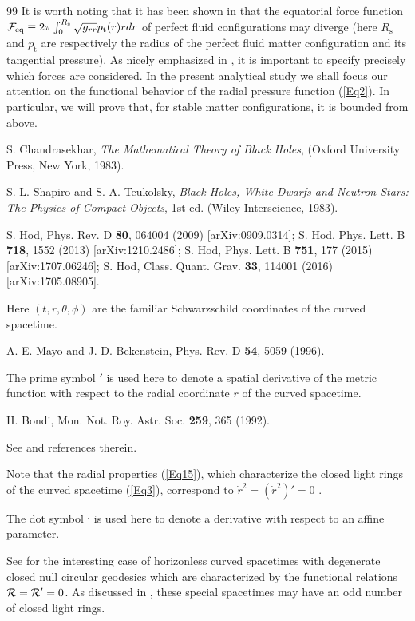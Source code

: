 \documentclass[preprintnumbers,amsmath,amssymbm,prd]{revtex4}
\begin{document}
\begin{thebibliography}{99}
 It is worth noting that it has been shown in \cite{JoVi} that the equatorial force function 
${\cal F}_{\text{eq}}\equiv 2\pi\int^{R_{\text{s}}}_{0}\sqrt{g_{rr}}p_{\text{t}}(r)rdr$ of perfect fluid configurations 
may diverge (here $R_{\text{s}}$ and $p_{\text{t}}$ are respectively the radius of the perfect fluid 
matter configuration and its tangential pressure). 
As nicely emphasized in \cite{JoVi}, it is important to specify precisely which forces are considered. 
In the present analytical study we shall focus our attention on 
the functional behavior of the radial pressure function (\ref{Eq2}). 
In particular, we will prove that, for stable matter configurations, it is bounded from above. 

 S. Chandrasekhar, {\it The Mathematical Theory of Black
Holes}, (Oxford University Press, New York, 1983).

 S. L. Shapiro and S. A. Teukolsky, {\it Black Holes, White
Dwarfs and Neutron Stars: The Physics of Compact Objects}, 1st ed.
(Wiley-Interscience, 1983).

 S. Hod, Phys. Rev. D {\bf 80}, 064004 (2009) [arXiv:0909.0314];
S. Hod, Phys. Lett. B {\bf 718}, 1552 (2013) [arXiv:1210.2486]; S.
Hod, Phys. Lett. B {\bf 751}, 177 (2015) [arXiv:1707.06246]; S. Hod,
Class. Quant. Grav. {\bf 33}, 114001 (2016) [arXiv:1705.08905].

 Here $(t,r,\theta,\phi)$ are the familiar Schwarzschild coordinates of the curved spacetime.

 A. E. Mayo and J. D. Bekenstein, Phys. Rev. D {\bf 54}, 5059 (1996).

 The prime symbol $'$ is used here to denote a spatial derivative of the 
metric function with respect to the radial coordinate $r$ of the curved spacetime.

 H. Bondi, Mon. Not. Roy. Astr. Soc. {\bf 259}, 365 (1992).

 See \cite{Hodt1} and references therein. 

 Note that the radial properties (\ref{Eq15}), which characterize the closed light rings 
of the curved spacetime (\ref{Eq3}), correspond to $\dot r^2=(\dot r^2)'=0$ \cite{Chan}.

 The dot symbol $^{.}$ is used here to denote a derivative with respect to an affine parameter.

 See \cite{Hoddd} for the interesting case of
horizonless curved spacetimes with degenerate closed null 
circular geodesics which are characterized by the functional relations ${\cal R}={\cal R}'=0$. 
As discussed in \cite{Hoddd}, these special spacetimes may have an odd
number of closed light rings.

\end{thebibliography}
\end{document}

